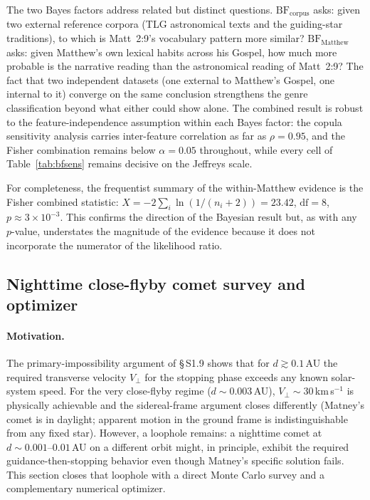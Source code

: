 \documentclass[11pt,a4paper]{article}
\begin{document}
The two Bayes factors address related but distinct questions.
$\mathrm{BF}_\text{corpus}$ asks: given two external reference corpora (TLG
astronomical texts and the guiding-star traditions), to which is Matt~2:9's
vocabulary pattern more similar? $\mathrm{BF}_\text{Matthew}$ asks: given
Matthew's own lexical habits across his Gospel, how much more probable is the
narrative reading than the astronomical reading of Matt~2:9? The fact that two
independent datasets (one external to Matthew's Gospel, one internal to
it) converge on the same conclusion strengthens the genre classification beyond
what either could show alone. The combined result is robust to the
feature-independence assumption within each Bayes factor: the copula
sensitivity analysis carries inter-feature correlation as far as
$\rho = 0.95$, and the Fisher combination remains below $\alpha = 0.05$
throughout, while every cell of Table~\ref{tab:bfsens} remains decisive on the
Jeffreys scale.

For completeness, the frequentist summary of the within-Matthew evidence is the
Fisher combined statistic: $X = -2\sum_i \ln(1/(n_i+2)) = 23.42$,
$\mathrm{df} = 8$, $p \approx 3\times10^{-3}$. This confirms the direction of
the Bayesian result but, as with any $p$-value, understates the magnitude of the
evidence because it does not incorporate the numerator of the likelihood ratio.

\subsection{Nighttime close-flyby comet survey and optimizer}
\label{subsec:closeflyby}

\paragraph{Motivation.}
The primary-impossibility argument of \S\,S1.9 shows that for $d \gtrsim 0.1$\,AU
the required transverse velocity $V_\perp$ for the stopping phase exceeds any
known solar-system speed. For the very close-flyby regime ($d \sim 0.003$\,AU),
$V_\perp \sim 30$\,km\,s$^{-1}$ is physically achievable and the sidereal-frame
argument closes differently (Matney's comet is in daylight; apparent motion in
the ground frame is indistinguishable from any fixed star). However, a loophole
remains: a nighttime comet at $d \sim 0.001$--$0.01$\,AU on a different orbit
might, in principle, exhibit the required guidance-then-stopping behavior even
though Matney's specific solution fails. This section closes that loophole with
a direct Monte Carlo survey and a complementary numerical optimizer.
\end{document}

